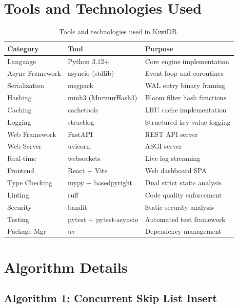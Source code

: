 \documentclass[oneside,a4paper,12pt]{book}
\begin{document}
\section{Tools and Technologies Used}

\begin{table}[H]
\centering
\renewcommand{\arraystretch}{1.3}
\begin{tabularx}{\textwidth}{|X|X|X|}
\hline
\textbf{Category} & \textbf{Tool} & \textbf{Purpose} \\
\hline
Language & Python 3.12+ & Core engine implementation \\
\hline
Async Framework & asyncio (stdlib) & Event loop and coroutines \\
\hline
Serialization & msgpack & WAL entry binary framing \\
\hline
Hashing & mmh3 (MurmurHash3) & Bloom filter hash functions \\
\hline
Caching & cachetools & LRU cache implementation \\
\hline
Logging & structlog & Structured key-value logging \\
\hline
Web Framework & FastAPI & REST API server \\
\hline
Web Server & uvicorn & ASGI server \\
\hline
Real-time & websockets & Live log streaming \\
\hline
Frontend & React + Vite & Web dashboard SPA \\
\hline
Type Checking & mypy + basedpyright & Dual strict static analysis \\
\hline
Linting & ruff & Code quality enforcement \\
\hline
Security & bandit & Static security analysis \\
\hline
Testing & pytest + pytest-asyncio & Automated test framework \\
\hline
Package Mgr & uv & Dependency management \\
\hline
\end{tabularx}
\caption{Tools and technologies used in KiwiDB.}
\label{tab:tech}
\end{table}

\newpage

\section{Algorithm Details}

\subsection{Algorithm 1: Concurrent Skip List Insert}
\end{document}
